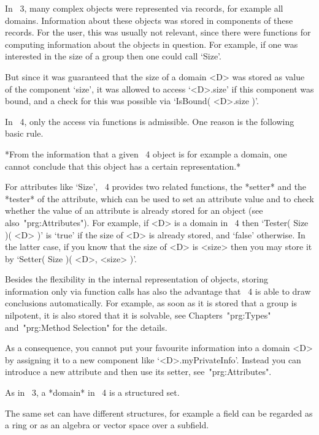 In {\GAP}~3, many complex objects were represented via records,
for example all domains.
Information about these objects was stored in components of these
records.
For the user, this was usually not relevant, since there were functions
for computing information about the objects in question.
For example, if one was interested in the size of a group then one could
call `Size'.

But since it was guaranteed that the size of a domain <D> was stored as
value of the component `size', it was allowed to access `<D>.size'
if this component was bound, and a check for this was possible via
`IsBound( <D>.size )'.

In {\GAP}~4, only the access via functions is admissible.
One reason is the following basic rule.

*From the information that a given {\GAP}~4 object is for example a
domain, one cannot conclude that this object has a certain
representation.*

For attributes like `Size', {\GAP}~4 provides two related functions,
the *setter* and the *tester* of the attribute, which can be used to
set an attribute value and to check whether the value of an attribute
is already stored for an object (see also~"prg:Attributes").
For example, if <D> is a domain in {\GAP}~4 then `Tester( Size )( <D> )'
is `true' if the size of <D> is already stored, and `false' otherwise.
In the latter case, if you know that the size of <D> is <size> then you
may store it by `Setter( Size )( <D>, <size> )'.

Besides the flexibility in the internal representation of objects,
storing information only via function calls has also the advantage that
{\GAP}~4 is able to draw conclusions automatically.
For example, as soon as it is stored that a group is nilpotent, it is
also stored that it is solvable, see Chapters~"prg:Types"
and~"prg:Method Selection" for the details.

As a consequence, you cannot put your favourite information into a
domain <D> by assigning it to a new component like `<D>.myPrivateInfo'.
Instead you can introduce a new attribute and then use its setter,
see~"prg:Attributes".



As in {\GAP}~3, a *domain* in {\GAP}~4 is a structured set.

The same set can have different structures, for example a field can be
regarded as a ring or as an algebra or vector space over a subfield.

